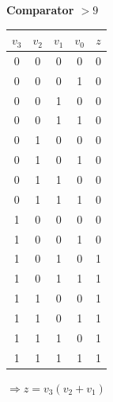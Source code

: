 \documentclass[13pt,a4paper]{report}
\begin{document}
\begin{minipage}[t]{0.5\textwidth}
{\bf \normalsize Comparator $>9$}
\begin{table}[H]
\centering
\begin{tabular}{cccc|c}
$v_3$ & $v_2$ & $v_1$ & $v_0$ & $z$ \\ \hline
0     & 0     & 0     & 0     & 0   \\
0     & 0     & 0     & 1     & 0   \\
0     & 0     & 1     & 0     & 0   \\
0     & 0     & 1     & 1     & 0   \\
0     & 1     & 0     & 0     & 0   \\
0     & 1     & 0     & 1     & 0   \\
0     & 1     & 1     & 0     & 0   \\
0     & 1     & 1     & 1     & 0   \\
1     & 0     & 0     & 0     & 0   \\
1     & 0     & 0     & 1     & 0   \\
1     & 0     & 1     & 0     & 1   \\
1     & 0     & 1     & 1     & 1   \\
1     & 1     & 0     & 0     & 1   \\
1     & 1     & 0     & 1     & 1   \\
1     & 1     & 1     & 0     & 1   \\
1     & 1     & 1     & 1     & 1  
\end{tabular}

$\Rightarrow z=v_3(v_2+v_1)$
\end{table}
\end{minipage}
\end{document}
